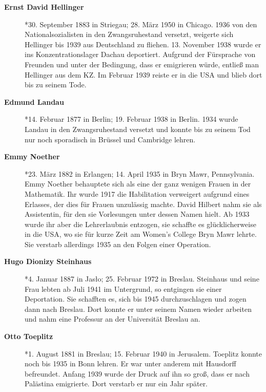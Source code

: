 \begin{description}
\item[\textbf{Ernst David Hellinger}] *30. September 1883 in Striegau; 28. März 1950 in Chicago. 1936 von den Nationalsozialisten in den Zwangsruhestand versetzt, weigerte sich Hellinger bis 1939 aus Deutschland zu fliehen. 13. November 1938 wurde er ins Konzentrationslager Dachau deportiert. Aufgrund der Fürsprache von Freunden und unter der Bedingung, dass er emigrieren würde, entließ man Hellinger aus dem KZ. Im Februar 1939 reiste er in die USA und blieb dort bis zu seinem Tode.
\item[\textbf{Edmund Landau}] *14. Februar 1877 in Berlin; 19. Februar 1938 in Berlin. 1934 wurde Landau in den Zwangsruhestand versetzt und konnte bis zu seinem Tod nur noch sporadisch in Brüssel und Cambridge lehren. 
\item[\textbf{Emmy Noether}] *23. März 1882 in Erlangen; 14. April 1935 in Bryn Mawr, Pennsylvania. Emmy Noether behauptete sich als eine der ganz wenigen Frauen in der Mathematik. Ihr wurde 1917 die Habilitation verweigert aufgrund eines Erlasses, der dies für Frauen unzulässig machte. David Hilbert nahm sie als Assistentin, für den sie Vorlesungen unter dessen Namen hielt. Ab 1933 wurde ihr aber die Lehrerlaubnis entzogen, sie schaffte es glücklicherweise in die USA, wo sie für kurze Zeit am Women's College Bryn Mawr lehrte. Sie verstarb allerdings 1935 an den Folgen einer Operation.
\item[\textbf{Hugo Dionizy Steinhaus}] *4. Januar 1887 in Jas\l o; 25. Februar 1972 in Breslau. Steinhaus und seine Frau lebten ab Juli 1941 im Untergrund, so entgingen sie einer Deportation. Sie schafften es, sich bis 1945 durchzuschlagen und zogen dann nach Breslau. Dort konnte er unter seinem Namen wieder arbeiten und nahm eine Professur an der Universität Breslau an.
\item[\textbf{Otto Toeplitz}] *1. August 1881 in Breslau; 15. Februar 1940 in Jerusalem. Toeplitz konnte noch bis 1935 in Bonn lehren. Er war unter anderem mit Hausdorff befreundet. Anfang 1939 wurde der Druck auf ihn so groß, dass er nach Palästina emigrierte. Dort verstarb er nur ein Jahr später. 

\end{description}



